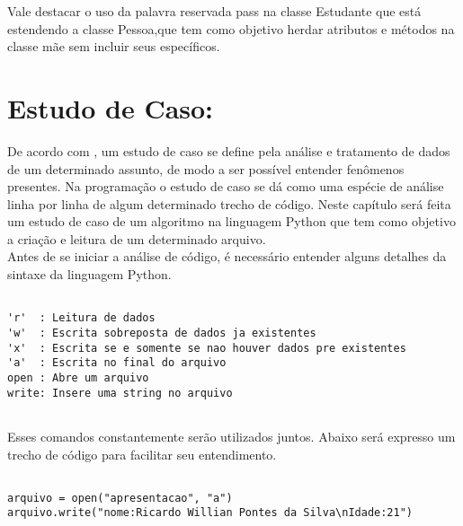 Vale destacar o uso da palavra reservada pass na classe Estudante que está estendendo a classe Pessoa,que tem como objetivo herdar atributos e métodos na classe mãe sem incluir seus específicos. 
    \section{Estudo de Caso: }
De acordo com \cite{Perkovic2016}, um estudo de caso se define pela análise e tratamento de dados de um determinado assunto, de modo a ser possível entender fenômenos presentes. Na programação o estudo de caso se dá como uma espécie de análise linha por linha de algum determinado trecho de código. Neste capítulo será feita um estudo de caso de um algoritmo na linguagem Python que tem como objetivo a criação e leitura de um determinado arquivo.\\
Antes de se iniciar a análise de código, é necessário entender alguns detalhes da sintaxe da linguagem Python.
\begin{lstlisting}
 	
'r'  : Leitura de dados
'w'  : Escrita sobreposta de dados ja existentes
'x'  : Escrita se e somente se nao houver dados pre existentes
'a'  : Escrita no final do arquivo
open : Abre um arquivo
write: Insere uma string no arquivo
	
\end{lstlisting}
Esses comandos constantemente serão utilizados juntos. Abaixo será expresso um trecho de código para facilitar seu entendimento.

\begin{lstlisting}

arquivo = open("apresentacao", "a")
arquivo.write("nome:Ricardo Willian Pontes da Silva\nIdade:21")

\end{lstlisting}
